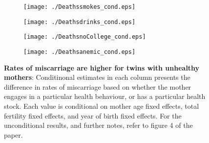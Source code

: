 \documentclass{nature}
\begin{document}
\begin{linenumbers}
\begin{spacing}{1}
\begin{figure}[htpb!]
\begin{subfigure}{.5\textwidth}
  \texttt{[image: ./Deathssmokes\_cond.eps]}
\end{subfigure}%
\begin{subfigure}{.5\textwidth}
  \texttt{[image: ./Deathsdrinks\_cond.eps]}
\end{subfigure}
\begin{subfigure}{.5\textwidth}
  \texttt{[image: ./DeathsnoCollege\_cond.eps]}
\end{subfigure}%
\begin{subfigure}{.5\textwidth}
  \texttt{[image: ./Deathsanemic\_cond.eps]}
\end{subfigure}
\vspace{5mm}
\caption{\textbf{Rates of miscarriage are higher for twins with unhealthy mothers}: {\footnotesize Conditinonal estimates in each column presents the difference in rates of miscarriage based on whether the mother engages in a particular health behaviour, or has a particular health stock.  Each value is conditional on mother age fixed effects, total fertility fixed effects, and year of birth fixed effects.  For the unconditional results, and further notes, refer to figure 4 of the paper.}}
\end{figure}
\end{spacing}


\end{linenumbers}
\end{document}
